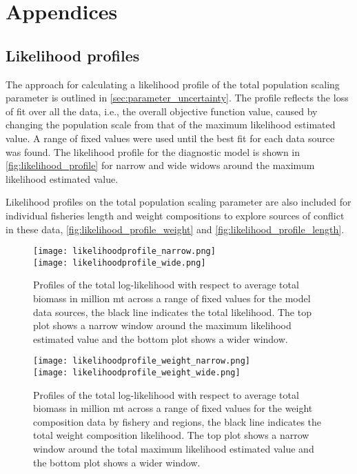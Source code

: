 
\newpage

\section{Appendices}
\label{sec:appendices}

\renewcommand\thefigure{\thesection.\arabic{figure}}
\renewcommand\thetable{\thesection.\arabic{table}}

\subsection{Likelihood profiles}
\label{sec:likelihood_profile}

The approach for calculating a likelihood profile of the total population scaling parameter is outlined in \autoref{sec:parameter_uncertainty}. The profile reflects the loss of fit over all the data, i.e., the overall objective function value, caused by changing the population scale from that of the maximum likelihood estimated value. A range of fixed values were used until the best fit for each data source was found. The likelihood profile for the diagnostic model is shown in \autoref{fig:likelihood_profile} for narrow and wide widows around the maximum likelihood estimated value.

Likelihood profiles on the total population scaling parameter are also included for individual fisheries length and weight compositions to explore sources of conflict in these data, \autoref{fig:likelihood_profile_weight} and \autoref{fig:likelihood_profile_length}.

\setcounter{figure}{0}
\begin{figure}[H]
  \centering
  \texttt{[image: likelihoodprofile\_narrow.png]}\\[10mm]
  \texttt{[image: likelihoodprofile\_wide.png]}
  \caption{Profiles of the total log-likelihood with respect to average total biomass in million mt across a range of fixed values for the model data sources, the black line indicates the total likelihood. The top plot shows a narrow window around the maximum likelihood estimated value and the bottom plot shows a wider window. \label{fig:likelihood_profile}}
\end{figure}

\clearpage

\begin{figure}[H]
  \centering
  \texttt{[image: likelihoodprofile\_weight\_narrow.png]}\\[10mm]
  \texttt{[image: likelihoodprofile\_weight\_wide.png]}
  \caption{Profiles of the total log-likelihood with respect to average total biomass in million mt across a range of fixed values for the weight composition data by fishery and regions, the black line indicates the total weight composition likelihood. The top plot shows a narrow window around the total maximum likelihood estimated value and the bottom plot shows a wider window. \label{fig:likelihood_profile_weight}}
\end{figure}

